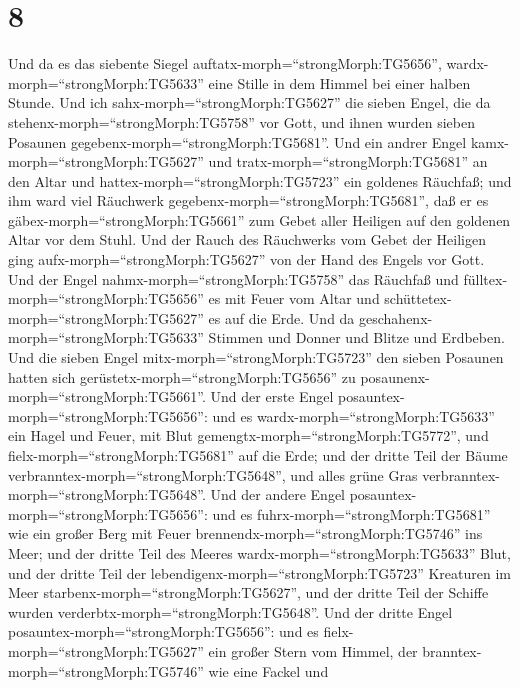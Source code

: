 \hypertarget{section-7}{%
\section{8}\label{section-7}}

 Und da es das siebente Siegel
auftatx-morph=``strongMorph:TG5656'', wardx-morph=``strongMorph:TG5633''
eine Stille in dem Himmel bei einer halben Stunde.  Und ich
sahx-morph=``strongMorph:TG5627'' die sieben Engel, die da
stehenx-morph=``strongMorph:TG5758'' vor Gott, und ihnen wurden sieben
Posaunen gegebenx-morph=``strongMorph:TG5681''.  Und ein
andrer Engel kamx-morph=``strongMorph:TG5627'' und
tratx-morph=``strongMorph:TG5681'' an den Altar und
hattex-morph=``strongMorph:TG5723'' ein goldenes Räuchfaß; und ihm ward
viel Räuchwerk gegebenx-morph=``strongMorph:TG5681'', daß er es
gäbex-morph=``strongMorph:TG5661'' zum Gebet aller Heiligen auf den
goldenen Altar vor dem Stuhl.  Und der Rauch des Räuchwerks
vom Gebet der Heiligen ging aufx-morph=``strongMorph:TG5627'' von der
Hand des Engels vor Gott.  Und der Engel
nahmx-morph=``strongMorph:TG5758'' das Räuchfaß und
fülltex-morph=``strongMorph:TG5656'' es mit Feuer vom Altar und
schüttetex-morph=``strongMorph:TG5627'' es auf die Erde. Und da
geschahenx-morph=``strongMorph:TG5633'' Stimmen und Donner und Blitze
und Erdbeben.  Und die sieben Engel
mitx-morph=``strongMorph:TG5723'' den sieben Posaunen hatten sich
gerüstetx-morph=``strongMorph:TG5656'' zu
posaunenx-morph=``strongMorph:TG5661''.  Und der erste Engel
posauntex-morph=``strongMorph:TG5656'': und es
wardx-morph=``strongMorph:TG5633'' ein Hagel und Feuer, mit Blut
gemengtx-morph=``strongMorph:TG5772'', und
fielx-morph=``strongMorph:TG5681'' auf die Erde; und der dritte Teil der
Bäume verbranntex-morph=``strongMorph:TG5648'', und alles grüne Gras
verbranntex-morph=``strongMorph:TG5648''.  Und der andere
Engel posauntex-morph=``strongMorph:TG5656'': und es
fuhrx-morph=``strongMorph:TG5681'' wie ein großer Berg mit Feuer
brennendx-morph=``strongMorph:TG5746'' ins Meer; und der dritte Teil des
Meeres wardx-morph=``strongMorph:TG5633'' Blut,  und der
dritte Teil der lebendigenx-morph=``strongMorph:TG5723'' Kreaturen im
Meer starbenx-morph=``strongMorph:TG5627'', und der dritte Teil der
Schiffe wurden verderbtx-morph=``strongMorph:TG5648''.  Und
der dritte Engel posauntex-morph=``strongMorph:TG5656'': und es
fielx-morph=``strongMorph:TG5627'' ein großer Stern vom Himmel, der
branntex-morph=``strongMorph:TG5746'' wie eine Fackel und
